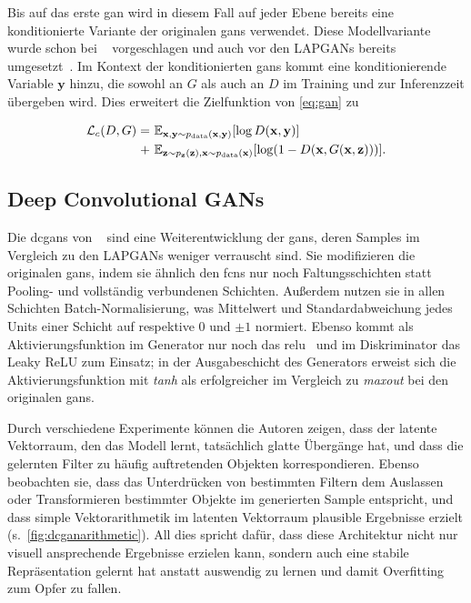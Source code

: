 Bis auf das erste \gls{gan} wird in diesem Fall auf jeder Ebene bereits eine konditionierte Variante der originalen \glspl{gan} verwendet.
Diese Modellvariante wurde schon bei \citeauthor{Goodfellow.2014}~\cite{Goodfellow.2014} vorgeschlagen und auch vor den LAPGANs bereits umgesetzt~\cite{Gauthier.2014,Mirza.2014}.
Im Kontext der konditionierten \glspl{gan} kommt eine konditionierende Variable $ \mathbf{y} $ hinzu, die sowohl an $ G $ als auch an $ D $ im Training und zur Inferenzzeit übergeben wird.
Dies erweitert die Zielfunktion von \autoref{eq:gan} zu

\begin{equation}\label{eq:canloss}
\begin{split}
\mathcal{L}_c(D, G) = & \ \mathbb{E}_{\mathbf{x}, \mathbf{y} \sim p_{\textup{data}}(\mathbf{x}, \mathbf{y})} [\log D(\mathbf{x}, \mathbf{y})] \\
+ & \ \mathbb{E}_{\mathbf{z} \sim p_{\mathbf{z}}(\mathbf{z}), \mathbf{x} \sim p_{\textup{data}}(\mathbf{x})} [\log(1 - D(\mathbf{x}, G(\mathbf{x}, \mathbf{z})))].
\end{split}
\end{equation}



\subsection{Deep Convolutional GANs}

Die \glspl{dcgan} von \citeauthor{Radford.2016}~\cite{Radford.2016} sind eine Weiterentwicklung der \glspl{gan}, deren Samples im Vergleich zu den LAPGANs weniger verrauscht sind.
Sie modifizieren die originalen \glspl{gan}, indem sie ähnlich den \glspl{fcn} nur noch Faltungsschichten statt Pooling- und vollständig verbundenen Schichten.
Außerdem nutzen sie in allen Schichten Batch-Normalisierung, was Mittelwert und Standardabweichung jedes Units einer Schicht auf respektive 0 und $ \pm 1 $ normiert.
Ebenso kommt als Aktivierungsfunktion im Generator nur noch das \gls{relu}~\cite{Nair.2010} und im Diskriminator das Leaky ReLU zum Einsatz; in der Ausgabeschicht des Generators erweist sich die Aktivierungsfunktion mit \emph{tanh} als erfolgreicher im Vergleich zu \emph{maxout} bei den originalen \glspl{gan}.

Durch verschiedene Experimente können die Autoren zeigen, dass der latente Vektorraum, den das Modell lernt, tatsächlich glatte Übergänge hat, und dass die gelernten Filter zu häufig auftretenden Objekten korrespondieren.
Ebenso beobachten sie, dass das Unterdrücken von bestimmten Filtern dem Auslassen oder Transformieren bestimmter Objekte im generierten Sample entspricht, und dass simple Vektorarithmetik im latenten Vektorraum plausible Ergebnisse erzielt (s.~\autoref{fig:dcganarithmetic}).
All dies spricht dafür, dass diese Architektur nicht nur visuell ansprechende Ergebnisse erzielen kann, sondern auch eine stabile Repräsentation gelernt hat anstatt auswendig zu lernen und damit Overfitting zum Opfer zu fallen.

